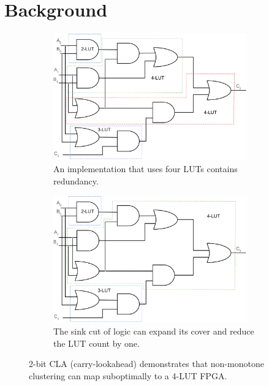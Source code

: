 \section{Background}\label{sec:background}

\begin{figure}[tb]
    \begin{subfigure}{0.49\textwidth}
        \centering
        \includegraphics[width=0.92\textwidth]{img/cla_bad.png}
        \caption{An implementation that uses four LUTs contains redundancy.}\label{fig:eg:bad}
    \end{subfigure}
    \hfill
    \begin{subfigure}{0.49\textwidth}
        \centering
        \includegraphics[width=0.92\textwidth]{img/cla_good.png}
        \caption{The sink cut of logic can expand its cover and reduce the LUT count by one.}\label{fig:eg:good}
    \end{subfigure}
    \caption{2-bit CLA (carry-lookahead) demonstrates that non-monotone clustering can map suboptimally to a 4-LUT FPGA.}\label{fig:eg}
\end{figure}

